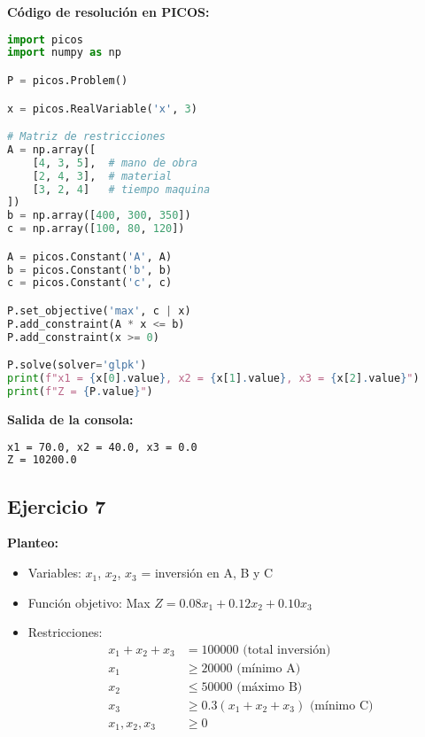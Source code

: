 \documentclass[12pt]{article}
\begin{document}
\textbf{Código de resolución en PICOS:}
\begin{lstlisting}[language=Python]
import picos
import numpy as np

P = picos.Problem()

x = picos.RealVariable('x', 3)

# Matriz de restricciones
A = np.array([
    [4, 3, 5],  # mano de obra
    [2, 4, 3],  # material
    [3, 2, 4]   # tiempo maquina
])
b = np.array([400, 300, 350])
c = np.array([100, 80, 120])

A = picos.Constant('A', A)
b = picos.Constant('b', b)
c = picos.Constant('c', c)

P.set_objective('max', c | x)
P.add_constraint(A * x <= b)
P.add_constraint(x >= 0)

P.solve(solver='glpk')
print(f"x1 = {x[0].value}, x2 = {x[1].value}, x3 = {x[2].value}")
print(f"Z = {P.value}")
\end{lstlisting}

\textbf{Salida de la consola:}
\begin{lstlisting}[language=bash,backgroundcolor=\color{black},basicstyle=\color{white}\ttfamily,numbers=none]
x1 = 70.0, x2 = 40.0, x3 = 0.0
Z = 10200.0
\end{lstlisting}

\subsection{Ejercicio 7}

\textbf{Planteo:}
\begin{itemize}
\item Variables: $x_1$, $x_2$, $x_3$ = inversión en A, B y C
\item Función objetivo: Max $Z = 0.08x_1 + 0.12x_2 + 0.10x_3$
\item Restricciones:
  \begin{align*}
  x_1 + x_2 + x_3 &= 100000 \text{ (total inversión)} \\
  x_1 &\geq 20000 \text{ (mínimo A)} \\
  x_2 &\leq 50000 \text{ (máximo B)} \\
  x_3 &\geq 0.3(x_1 + x_2 + x_3) \text{ (mínimo C)} \\
  x_1, x_2, x_3 &\geq 0
  \end{align*}
\end{itemize}
\end{document}
